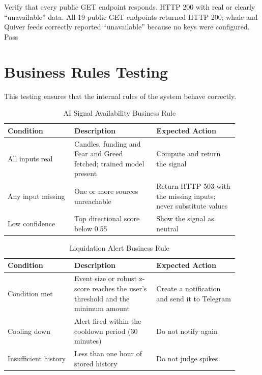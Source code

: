 {Verify that every public GET endpoint responds.}
{HTTP 200 with real or clearly ``unavailable'' data.}
{All 19 public GET endpoints returned HTTP 200; whale and Quiver feeds correctly reported ``unavailable'' because no keys were configured.}
{Pass}

\section{Business Rules Testing}
This testing ensures that the internal rules of the system behave correctly.

{\renewcommand{\arraystretch}{1.3}
\begin{longtable}{|p{0.26\linewidth}|p{0.32\linewidth}|p{0.32\linewidth}|}
\caption{AI Signal Availability Business Rule}\label{tab:br-signal}\\\hline
\textbf{Condition} & \textbf{Description} & \textbf{Expected Action}\\\hline
All inputs real & Candles, funding and Fear and Greed fetched; trained model present & Compute and return the signal\\\hline
Any input missing & One or more sources unreachable & Return HTTP 503 with the missing inputs; never substitute values\\\hline
Low confidence & Top directional score below 0.55 & Show the signal as neutral\\\hline
\end{longtable}}

{\renewcommand{\arraystretch}{1.3}
\begin{longtable}{|p{0.26\linewidth}|p{0.32\linewidth}|p{0.32\linewidth}|}
\caption{Liquidation Alert Business Rule}\label{tab:br-liq}\\\hline
\textbf{Condition} & \textbf{Description} & \textbf{Expected Action}\\\hline
Condition met & Event size or robust z-score reaches the user's threshold and the minimum amount & Create a notification and send it to Telegram\\\hline
Cooling down & Alert fired within the cooldown period (30 minutes) & Do not notify again\\\hline
Insufficient history & Less than one hour of stored history & Do not judge spikes\\\hline
\end{longtable}}

